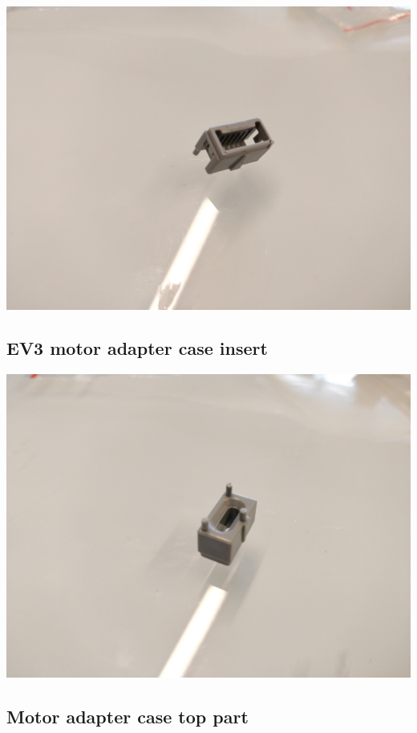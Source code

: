 \documentclass[a4paper,12pt]{article}
\begin{document}
\includegraphics[width=13.5cm]{wedo2-motor-plastic-insert.jpg}

\subsection{EV3 motor adapter case insert}

\includegraphics[width=13.5cm]{ev3-motor-plastic-insert.jpg}

\subsection{Motor adapter case top part}
\end{document}
